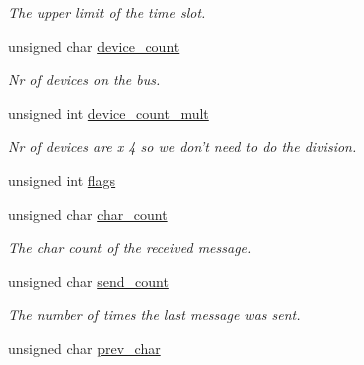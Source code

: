 \begin{CompactItemize}
\begin{CompactList}\small\item\em The upper limit of the time slot. \item\end{CompactList}\item 
\hypertarget{structbus__status__struct_3762bd8a130d245b2eb5e2f480ee0909}{
unsigned char \hyperlink{structbus__status__struct_3762bd8a130d245b2eb5e2f480ee0909}{device\_\-count}}
\label{structbus__status__struct_3762bd8a130d245b2eb5e2f480ee0909}

\begin{CompactList}\small\item\em Nr of devices on the bus. \item\end{CompactList}\item 
\hypertarget{structbus__status__struct_77f6e56dc4ede20b2e0272da3dcc3d1e}{
unsigned int \hyperlink{structbus__status__struct_77f6e56dc4ede20b2e0272da3dcc3d1e}{device\_\-count\_\-mult}}
\label{structbus__status__struct_77f6e56dc4ede20b2e0272da3dcc3d1e}

\begin{CompactList}\small\item\em Nr of devices are x 4 so we don't need to do the division. \item\end{CompactList}\item 
unsigned int \hyperlink{structbus__status__struct_992015a05b62e4fed7aca512c79fa43f}{flags}
\item 
\hypertarget{structbus__status__struct_88ac4fc18b7b674b56a8e10f5682d2d4}{
unsigned char \hyperlink{structbus__status__struct_88ac4fc18b7b674b56a8e10f5682d2d4}{char\_\-count}}
\label{structbus__status__struct_88ac4fc18b7b674b56a8e10f5682d2d4}

\begin{CompactList}\small\item\em The char count of the received message. \item\end{CompactList}\item 
\hypertarget{structbus__status__struct_5707b844671927864dc05377ddbc139e}{
unsigned char \hyperlink{structbus__status__struct_5707b844671927864dc05377ddbc139e}{send\_\-count}}
\label{structbus__status__struct_5707b844671927864dc05377ddbc139e}

\begin{CompactList}\small\item\em The number of times the last message was sent. \item\end{CompactList}\item 
\hypertarget{structbus__status__struct_c95bc069ac43b36614fc792d7f80e435}{
unsigned char \hyperlink{structbus__status__struct_c95bc069ac43b36614fc792d7f80e435}{prev\_\-char}}
\label{structbus__status__struct_c95bc069ac43b36614fc792d7f80e435}


\end{CompactItemize}
